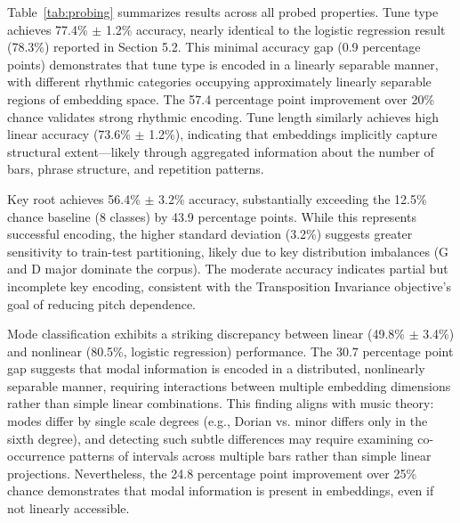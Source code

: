 \documentclass[]{interact}
\theoremstyle{plain}
\theoremstyle{definition}
\theoremstyle{remark}
\begin{document}
Table~\ref{tab:probing} summarizes results across all probed properties. Tune type achieves 77.4\% $\pm$ 1.2\% accuracy, nearly identical to the logistic regression result (78.3\%) reported in Section 5.2. This minimal accuracy gap (0.9 percentage points) demonstrates that tune type is encoded in a linearly separable manner, with different rhythmic categories occupying approximately linearly separable regions of embedding space. The 57.4 percentage point improvement over 20\% chance validates strong rhythmic encoding. Tune length similarly achieves high linear accuracy (73.6\% $\pm$ 1.2\%), indicating that embeddings implicitly capture structural extent---likely through aggregated information about the number of bars, phrase structure, and repetition patterns.

Key root achieves 56.4\% $\pm$ 3.2\% accuracy, substantially exceeding the 12.5\% chance baseline (8 classes) by 43.9 percentage points. While this represents successful encoding, the higher standard deviation (3.2\%) suggests greater sensitivity to train-test partitioning, likely due to key distribution imbalances (G and D major dominate the corpus). The moderate accuracy indicates partial but incomplete key encoding, consistent with the Transposition Invariance objective's goal of reducing pitch dependence.

Mode classification exhibits a striking discrepancy between linear (49.8\% $\pm$ 3.4\%) and nonlinear (80.5\%, logistic regression) performance. The 30.7 percentage point gap suggests that modal information is encoded in a distributed, nonlinearly separable manner, requiring interactions between multiple embedding dimensions rather than simple linear combinations. This finding aligns with music theory: modes differ by single scale degrees (e.g., Dorian vs. minor differs only in the sixth degree), and detecting such subtle differences may require examining co-occurrence patterns of intervals across multiple bars rather than simple linear projections. Nevertheless, the 24.8 percentage point improvement over 25\% chance demonstrates that modal information is present in embeddings, even if not linearly accessible.
\end{document}
